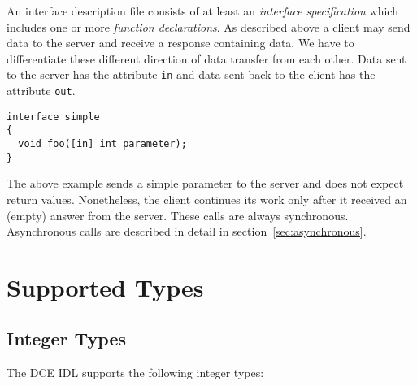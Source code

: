 An interface description file consists of at least an {\em interface
specification} which includes one or more {\em function declarations}.  As
described above a client may send data to the server and receive a response
containing data. We have to differentiate these different direction of data
transfer from each other. Data sent to the server has the attribute \verb|in|
and data sent back to the client has the attribute \verb|out|.

\begin{verbatim}
interface simple
{
  void foo([in] int parameter);
}
\end{verbatim}

The above example sends a simple parameter to the server and does not expect
return values. Nonetheless, the client continues its work only after it
received an (empty) answer from the server. These calls are always
synchronous.  Asynchronous calls are described in detail in
section~\ref{sec:asynchronous}.

\section{Supported Types}

\subsection{Integer Types}
The DCE IDL supports the following integer types:

